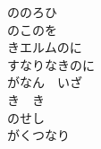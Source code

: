 \documentclass[10pt,b5j]{tarticle} %
\begin{document}
\begin{enumerate}
\begin{minipage}[c]{\blocksize}
        \vspace{\linespace}
        \item
        ののろひ\\
        のこのを\\
        きエルムのに\\
        すなりなきのに\\
        がなん　いざ\\
        き　き\\
        のせし\\
        がくつなり
    
    \end{minipage}
\end{enumerate} %
\end{document}
